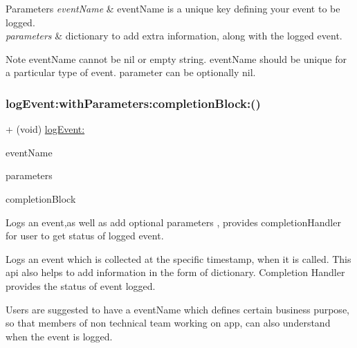 \begin{DoxyParams}{Parameters}
{\em event\+Name} & event\+Name is a unique key defining your event to be logged. \\
\hline
{\em parameters} & dictionary to add extra information, along with the logged event.\\
\hline
\end{DoxyParams}
\begin{DoxyNote}{Note}
event\+Name cannot be nil or empty string. event\+Name should be unique for a particular type of event. parameter can be optionally nil. 
\end{DoxyNote}
\mbox{\label{interface_n_f_logger_a92e20244e4fd66dca9596a9e758cc6a1}} 
\subsubsection{\texorpdfstring{log\+Event\+:with\+Parameters\+:completion\+Block\+:()}{logEvent:withParameters:completionBlock:()}}
{\footnotesize\ttfamily + (void) \hyperlink{interface_n_f_logger_a932bba0925a8ffefec035de7f3cff73a}{log\+Event\+:} \begin{DoxyParamCaption}\item[{(N\+S\+String $\ast$)}]{event\+Name }\item[{withParameters:(N\+S\+Dictionary $\ast$)}]{parameters }\item[{completionBlock:(void($^\wedge$)(N\+F\+L\+O\+G\+Record\+Status record\+Status))}]{completion\+Block }\end{DoxyParamCaption}}



Logs an event,as well as add optional parameters , provides completion\+Handler for user to get status of logged event. 

Logs an event which is collected at the specific timestamp, when it is called. This api also helps to add information in the form of dictionary. Completion Handler provides the status of event logged.

Users are suggested to have a event\+Name which defines certain business purpose, so that members of non technical team working on app, can also understand when the event is logged.


